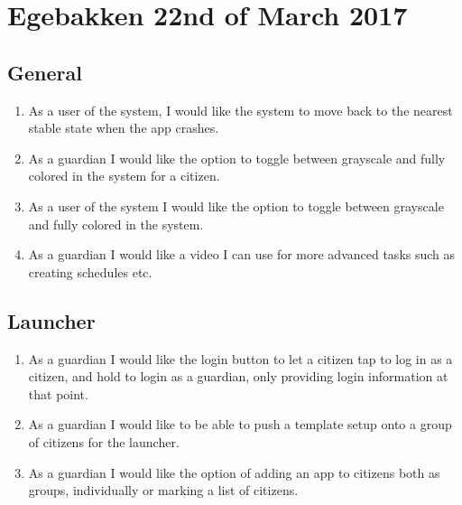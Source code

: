 \newpage
\section{Egebakken 22nd of March 2017}\label{EgebakkenUserStories2203}
\subsection*{General}

\begin{enumerate}
  \setlength\itemsep{0em}
  \item As a user of the system, I would like the system to move back to the nearest stable state when the app crashes.
  \item As a guardian I would like the option to toggle between grayscale and fully colored in the system for a citizen.
  \item As a user of the system I would like the option to toggle between grayscale and fully colored in the system.
  \item As a guardian I would like a video I can use for more advanced tasks such as creating schedules etc.
\end{enumerate}

\subsection*{Launcher}
\begin{enumerate}
  \setlength\itemsep{0em}
  \item As a guardian I would like the login button to let a citizen tap to log in as a citizen, and hold to login as a guardian, only providing login information at that point.
  \item As a guardian I would like to be able to push a template setup onto a group of citizens for the launcher.
  \item As a guardian I would like the option of adding an app to citizens both as groups, individually or marking a list of citizens.
\end{enumerate}

